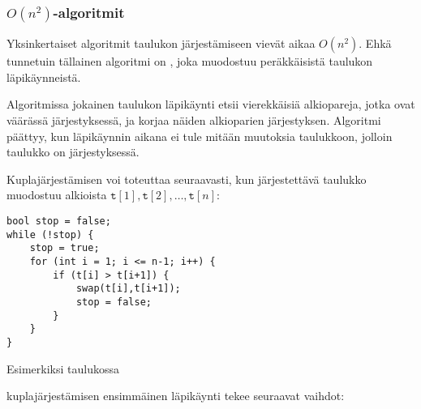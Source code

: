 \subsubsection{$O(n^2)$-algoritmit}


Yksinkertaiset algoritmit taulukon
järjestämiseen vievät aikaa $O(n^2)$.
Ehkä tunnetuin tällainen algoritmi on
,
joka muodostuu peräkkäisistä taulukon läpikäynneistä.

Algoritmissa jokainen taulukon läpikäynti
etsii vierekkäisiä alkiopareja,
jotka ovat väärässä järjestyksessä,
ja korjaa näiden alkioparien järjestyksen.
Algoritmi päättyy, kun läpikäynnin
aikana ei tule mitään muutoksia taulukkoon,
jolloin taulukko on järjestyksessä.

Kuplajärjestämisen voi toteuttaa seuraavasti,
kun järjestettävä taulukko muodostuu alkioista
$\texttt{t}[1],\texttt{t}[2],\ldots,\texttt{t}[n]$:
\begin{lstlisting}
bool stop = false;
while (!stop) {
    stop = true;
    for (int i = 1; i <= n-1; i++) {
        if (t[i] > t[i+1]) {
            swap(t[i],t[i+1]);
            stop = false;
        }
    }
}
\end{lstlisting}

\noindent
Esimerkiksi taulukossa

\begin{center}
\end{center}

\noindent
kuplajärjestämisen ensimmäinen
läpikäynti tekee seuraavat vaihdot:

\begin{center}
\end{center}

